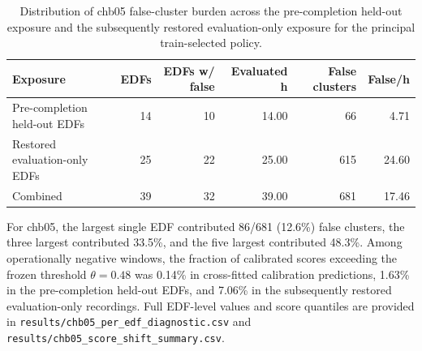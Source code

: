 \documentclass[11pt,a4paper]{article}
\begin{document}
\begin{table}[H]
\centering
\caption{Distribution of chb05 false-cluster burden across the pre-completion held-out exposure and the subsequently restored evaluation-only exposure for the principal train-selected policy.}
\label{tab:chb05_diagnostic}
\scriptsize
\setlength{\tabcolsep}{5pt}
\begin{tabular}{@{}lrrrrr@{}}
\toprule
Exposure & EDFs & EDFs w/ false & Evaluated h & False clusters & False/h \\
\midrule
Pre-completion held-out EDFs & 14 & 10 & 14.00 & 66 & 4.71 \\
Restored evaluation-only EDFs & 25 & 22 & 25.00 & 615 & 24.60 \\
\midrule
Combined & 39 & 32 & 39.00 & 681 & 17.46 \\
\bottomrule
\end{tabular}
\end{table}

For chb05, the largest single EDF contributed 86/681 (12.6\%) false clusters, the three largest contributed 33.5\%, and the five largest contributed 48.3\%. Among operationally negative windows, the fraction of calibrated scores exceeding the frozen threshold $\theta=0.48$ was 0.14\% in cross-fitted calibration predictions, 1.63\% in the pre-completion held-out EDFs, and 7.06\% in the subsequently restored evaluation-only recordings. Full EDF-level values and score quantiles are provided in \texttt{results/chb05\_per\_edf\_diagnostic.csv} and \texttt{results/chb05\_score\_shift\_summary.csv}.



\end{document}
